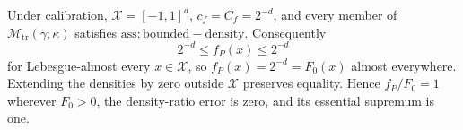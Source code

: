 Under calibration, \(\mathcal X=[-1,1]^d\), \(c_f=C_f=2^{-d}\), and every member of \(\mathcal M_{\mathrm{tr}}(\gamma;\kappa)\) satisfies \(\mathrm{ass:bounded-density}\). Consequently
\[
2^{-d}\le f_P(x)\le2^{-d}
\]
for Lebesgue-almost every \(x\in\mathcal X\), so \(f_P(x)=2^{-d}=F_0(x)\) almost everywhere. Extending the densities by zero outside \(\mathcal X\) preserves equality. Hence \(f_P/F_0=1\) wherever \(F_0>0\), the density-ratio error is zero, and its essential supremum is one.